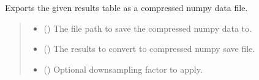\documentclass[letterpaper,10pt,english]{sphinxmanual}
\begin{document}
\begin{fulllineitems}
\label{\detokenize{modules/output/formats:qnav.output.formats.save_as_binary}}
\pysigstartsignatures
{}
\pysigstopsignatures
\sphinxAtStartPar
Exports the given results table as a compressed numpy data file.
\begin{quote}\begin{description}
\begin{itemize}
\item {} 
\sphinxAtStartPar
{} () \textendash{} The file path to save the compressed numpy data to.

\item {} 
\sphinxAtStartPar
{} ({\hyperref[\detokenize{modules/output/data:qnav.output.data.ResultsTable}]{}}) \textendash{} The results to convert to compressed numpy save file.

\item {} 
\sphinxAtStartPar
{} () \textendash{} Optional down\sphinxhyphen{}sampling factor to apply.

\end{itemize}

\end{description}\end{quote}

\end{fulllineitems}

\end{document}
